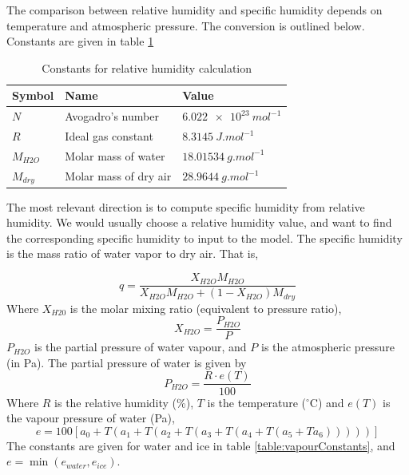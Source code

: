 \documentclass[11pt]{article}
\begin{document}
The comparison between relative humidity and specific humidity depends on temperature and atmospheric pressure. The conversion is outlined below. Constants are given in table \ref{table:humidityConstants}

\begin{table}
\begin{tabularx}{\textwidth}{X X X}
\hline
\textbf{Symbol} & \textbf{Name} & \textbf{Value} \\ \hline \hline
$N$ & Avogadro's number & $\SI{6.022e23}{{mol}^{-1}}$ \\ \hline
$R$ & Ideal gas constant & $\SI{8.3145}{J.{mol}^{-1}}$ \\ \hline
$M_{H2O}$ & Molar mass of water & $\SI{18.01534}{g.{mol}^{-1}}$ \\ \hline
$M_{dry}$ & Molar mass of dry air & $\SI{28.9644}{g.{mol}^{-1}}$ \\ \hline
\end{tabularx}
\caption{Constants for relative humidity calculation}
\label{table:humidityConstants}
\end{table}

The most relevant direction is to compute specific humidity from relative humidity. We would usually choose a relative humidity value, and want to find the corresponding specific humidity to input to the model. The specific humidity is the mass ratio of water vapor to dry air. That is,

\begin{equation}
\label{eq:specificHumidity}
q = \frac{X_{H2O}M_{H2O}}{X_{H2O}M_{H2O} + \left(1 - X_{H2O}\right) M_{dry}}
\end{equation}
Where $X_{H20}$ is the molar mixing ratio (equivalent to pressure ratio), 
\begin{equation}
X_{H2O} = \frac{P_{H2O}}{P}
\end{equation}
$P_{H2O}$ is the partial pressure of water vapour, and $P$ is the atmospheric pressure (in Pa). The partial pressure of water is given by
\begin{equation}
P_{H2O} = \frac{R \cdot e(T)}{100}
\end{equation}
Where $R$ is the relative humidity (\%), $T$ is the temperature ($^{\circ}\textrm{C}$) and $e(T)$ is the vapour pressure of water (Pa),
\begin{equation}
e = 100 \left[a_0 + T \left( a_1 + T \left( a_2 + T \left( a_3 + T \left( a_4 + T \left( a_5 + T a_6 \right) \right) \right) \right) \right) \right]
\label{eq:vapourPressure}
\end{equation}
The constants are given for water and ice in table \ref{table:vapourConstants}, and $e = \min\left({e_{water}},{e_{ice}}\right)$.
\end{document}
